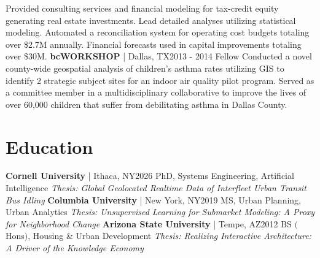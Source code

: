\documentclass{article}
\begin{document}
\begin{bgbox}[
        height = \paperheight,
        width = 0.69\textwidth,
        colback = white
    ]
{                Provided consulting services and financial modeling for tax-credit equity generating real estate investments. Lead detailed analyses utilizing statistical modeling. Automated a reconciliation system for operating cost budgets totaling over \$2.7M annually. Financial forecasts used in capital improvements totaling over \$30M.
                \newline\newline
                \textbf{bcWORKSHOP} | Dallas, TX\hfill{2013 - 2014}\newline
                    Fellow\newline\newline
                Conducted a novel county-wide geospatial analysis of children's asthma rates utilizing GIS to identify 2 strategic subject sites for an indoor air quality pilot program. Served as a committee member in a multidisciplinary collaborative to improve the lives of over 60,000 children that suffer from debilitating asthma in Dallas County.
            \section*{Education}
                \textbf{Cornell University} | Ithaca, NY\hfill{2026}\newline
                        PhD, Systems Engineering, Artificial Intelligence\newline
                            \textit{Thesis: Global Geolocated Realtime Data of Interfleet Urban Transit Bus Idling}\newline\newline
                \textbf{Columbia University} | New York, NY\hfill{2019}\newline
                        MS, Urban Planning, Urban Analytics\newline
                            \textit{Thesis: Unsupervised Learning for Submarket Modeling: A Proxy for Neighborhood Change}\newline\newline
                \textbf{Arizona State University} | Tempe, AZ\hfill{2012}\newline 
                        BS $($Hons$)$, Housing \& Urban Development\newline
                            \textit{Thesis: Realizing Interactive Architecture: A Driver of the Knowledge Economy}
}
\end{bgbox}
\end{document}
